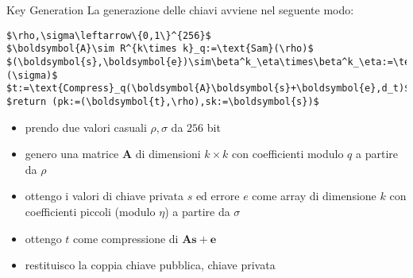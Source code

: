 \begin{frame}[fragile]{Key Generation}
    La generazione delle chiavi avviene nel seguente modo:

    \vspace{\baselineskip}

    \begin{minipage}{0.35\linewidth}
        \begin{lstlisting}[title=Kyber.CPA.KeyGen():,mathescape=true]
$\rho,\sigma\leftarrow\{0,1\}^{256}$
$\boldsymbol{A}\sim R^{k\times k}_q:=\text{Sam}(\rho)$
$(\boldsymbol{s},\boldsymbol{e})\sim\beta^k_\eta\times\beta^k_\eta:=\text{Sam}(\sigma)$
$t:=\text{Compress}_q(\boldsymbol{A}\boldsymbol{s}+\boldsymbol{e},d_t)$
$return (pk:=(\boldsymbol{t},\rho),sk:=\boldsymbol{s})$
        \end{lstlisting}
    \end{minipage}\hfill
    \begin{minipage}{0.6\linewidth}
        \begin{itemize}%
            \item prendo due valori casuali $\rho,\sigma$ da $256$ bit
            \item genero una matrice $\boldsymbol{A}$ di dimensioni $k\times k$ con coefficienti modulo $q$ a partire da $\rho$
            \item ottengo i valori di chiave privata $s$ ed errore $e$ come array di dimensione $k$ con coefficienti piccoli (modulo $\eta$) a partire da $\sigma$
            \item ottengo $t$ come compressione di $\boldsymbol{A}\boldsymbol{s}+\boldsymbol{e}$
            \item restituisco la coppia chiave pubblica, chiave privata
        \end{itemize}
    \end{minipage}

\end{frame}

